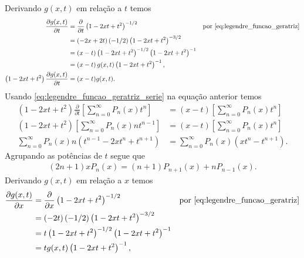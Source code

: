 \documentclass[a4paper,12pt, leqno, answers]{exam}
\begin{document}
\begin{questions}
\begin{solution}
        Derivando $g(x, t)$ em rela\c{c}\~{a}o a $t$ temos
        \begin{align*}
            \frac{\partial g(x,t)}{\partial t} &= \frac{\partial}{\partial t}\left( 1 - 2 x t + t^2 \right)^{-1/2} && \text{por \eqref{eq:legendre_funcao_geratriz}} \\
            &= \left( - 2 x + 2 t \right) (-1/2) \left( 1 - 2 x t + t^2 \right)^{-3/2} \\
            &= \left( x - t \right) \left( 1 - 2 x t + t^2 \right)^{-1/2} \left( 1 - 2 x t + t^2 \right)^{-1} \\
            &= \left( x - t \right) g(x, t) \left( 1 - 2 x t + t^2 \right)^{-1}, \\
            \left( 1 - 2 x t + t^2 \right) \frac{\partial g(x, t)}{\partial t} &= (x - t) g(x, t).
        \end{align*}
        Usando \eqref{eq:legendre_funcao_geratriz_serie} na equa\c{c}\~{a}o anterior temos
        \begin{align*}
            \left( 1 - 2 x t + t^2 \right) \frac{\partial}{\partial t}\left[ \sum_{n = 0}^\infty P_n(x) t^n \right] &= (x - t) \left[ \sum_{n = 0}^\infty P_n(x) t^n \right] \\
            \left( 1 - 2 x t + t^2 \right) \left[ \sum_{n = 0}^\infty P_n(x) n t^{n - 1} \right] &= (x - t) \left[ \sum_{n = 0}^\infty P_n(x) t^n \right] \\
            \sum_{n = 0}^\infty P_n(x) n \left( t^{n - 1} - 2 x t^{n} + t^{n + 1} \right) &= \sum_{n = 0}^\infty P_n(x) (x t^n - t^{n + 1}).
        \end{align*}
        Agrupando as pot\^{e}ncias de $t$ segue que
        \begin{align}
            (2n + 1) x P_n(x) = (n + 1) P_{n + 1}(x) + n P_{n - 1}(x). \label{eq:legendre_rel_rec_2n+1}
        \end{align}
        Derivando $g(x, t)$ em rela\c{c}\~{a}o a $x$ temos
        \begin{align*}
            \frac{\partial g(x,t)}{\partial x} &= \frac{\partial}{\partial x}\left( 1 - 2 x t + t^2 \right)^{-1/2} && \text{por \eqref{eq:legendre_funcao_geratriz}} \\
            &= \left( - 2 t \right) (-1/2) \left( 1 - 2 x t + t^2 \right)^{-3/2} \\
            &= t \left( 1 - 2 x t + t^2 \right)^{-1/2} \left( 1 - 2 x t + t^2 \right)^{-1} \\
            &= t g(x, t) \left( 1 - 2 x t + t^2 \right)^{-1}, \\

\end{align*}
\end{solution}
\end{questions}
\end{document}
